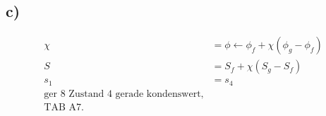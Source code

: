 

\subsection*{c)}
\begin{align*}
\chi &= \phi \leftarrow \phi_f + \chi \left( \phi_g - \phi_f \right) \\
S &= S_f + \chi \left( S_g - S_f \right) \\
s_1 &= s_4 \\
\text{ger } 8 \text{ Zustand 4 gerade kondenswert,} \\
\text{TAB A7.}
\end{align*}